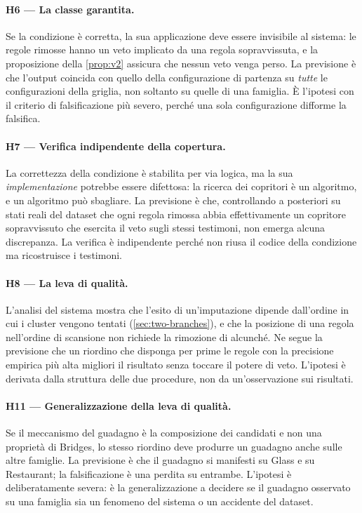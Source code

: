 \paragraph{H6 --- La classe garantita.} Se la condizione \Vtwo{} è corretta, la sua applicazione
deve essere invisibile al sistema: le regole rimosse hanno un veto implicato da una regola
sopravvissuta, e la proposizione della \autoref{prop:v2} assicura che nessun veto venga perso. La
previsione è che l'output coincida con quello della configurazione di partenza su \emph{tutte} le
configurazioni della griglia, non soltanto su quelle di una famiglia. È l'ipotesi con il criterio
di falsificazione più severo, perché una sola configurazione difforme la falsifica.

\paragraph{H7 --- Verifica indipendente della copertura.} La correttezza della condizione \Vtwo{}
è stabilita per via logica, ma la sua \emph{implementazione} potrebbe essere difettosa: la ricerca
dei copritori è un algoritmo, e un algoritmo può sbagliare. La previsione è che, controllando a
posteriori su stati reali del dataset che ogni regola rimossa abbia effettivamente un copritore
sopravvissuto che esercita il veto sugli stessi testimoni, non emerga alcuna discrepanza. La
verifica è indipendente perché non riusa il codice della condizione ma ricostruisce i testimoni.

\paragraph{H8 --- La leva di qualità.} L'analisi del sistema mostra che l'esito di
un'imputazione dipende dall'ordine in cui i cluster vengono tentati
(\autoref{sec:two-branches}), e che la posizione di una regola nell'ordine di scansione non
richiede la rimozione di alcunché. Ne segue la previsione che un riordino che disponga per prime
le regole con la precisione empirica più alta migliori il risultato senza toccare il potere di
veto. L'ipotesi è derivata dalla struttura delle due procedure, non da un'osservazione sui
risultati.

\paragraph{H11 --- Generalizzazione della leva di qualità.} Se il meccanismo del guadagno è la
composizione dei candidati e non una proprietà di Bridges, lo stesso riordino deve produrre un
guadagno anche sulle altre famiglie. La previsione è che il guadagno si manifesti su Glass e su
Restaurant; la falsificazione è una perdita su entrambe. L'ipotesi è deliberatamente severa: è la
generalizzazione a decidere se il guadagno osservato su una famiglia sia un fenomeno del sistema o
un accidente del dataset.

